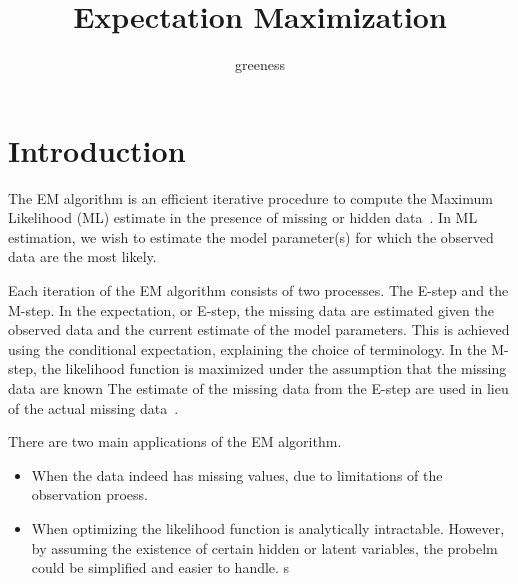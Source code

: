 \documentclass{article}  %
\begin{document}
\title{Expectation Maximization}   %
\author{greeness}         %
\maketitle


\section{Introduction}

The EM algorithm is an efficient iterative procedure to compute the Maximum Likelihood (ML) estimate in the presence of missing or hidden data~\cite{sb}. In ML estimation, we wish to estimate the model parameter(s) for which the observed data are the most likely.

Each iteration of the EM algorithm consists of two processes. The E-step and the M-step. In the expectation, or E-step, the missing data are estimated given the observed data and the current estimate of the model parameters. This is achieved using the conditional expectation, explaining the choice of terminology. In the M-step, the likelihood function is maximized under the assumption that the missing data are known The estimate of the missing data from the E-step are used in lieu of the actual missing data~\cite{sb}.

There are two main applications of the EM algorithm. 
\begin{itemize}
  \item When the data indeed has missing values, due to limitations of the
  observation proess.
  \item When optimizing the likelihood function is analytically intractable.
  However, by assuming the existence of certain hidden or latent variables, the
  probelm could be simplified and easier to handle. s
\end{itemize}
\end{document}
